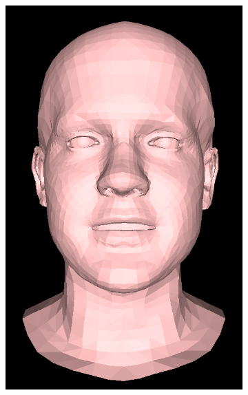 \begin{figure}[h!]
\begin{subfigure}[b]{0.19\textwidth}
        \includegraphics[width=\textwidth]{figures/gen_sample/00033.png}
    \end{subfigure}
    \begin{subfigure}[b]{0.19\textwidth}

\end{subfigure}
\end{figure}
